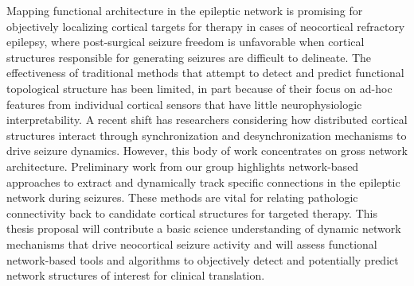 Mapping functional architecture in the epileptic network is promising for objectively localizing cortical targets for therapy in cases of neocortical refractory epilepsy, where post-surgical seizure freedom is unfavorable when cortical structures responsible for generating seizures are difficult to delineate. The effectiveness of traditional methods that attempt to detect and predict functional topological structure has been limited, in part because of their focus on ad-hoc features from individual cortical sensors that have little neurophysiologic interpretability. A recent shift has researchers considering how distributed cortical structures interact through synchronization and desynchronization mechanisms to drive seizure dynamics. However, this body of work concentrates on gross network architecture. Preliminary work from our group highlights network-based approaches to extract and dynamically track specific connections in the epileptic network during seizures. These methods are vital for relating pathologic connectivity back to candidate cortical structures for targeted therapy. This thesis proposal will contribute a basic science understanding of dynamic network mechanisms that drive neocortical seizure activity and will assess functional network-based tools and algorithms to objectively detect and potentially predict network structures of interest for clinical translation.

